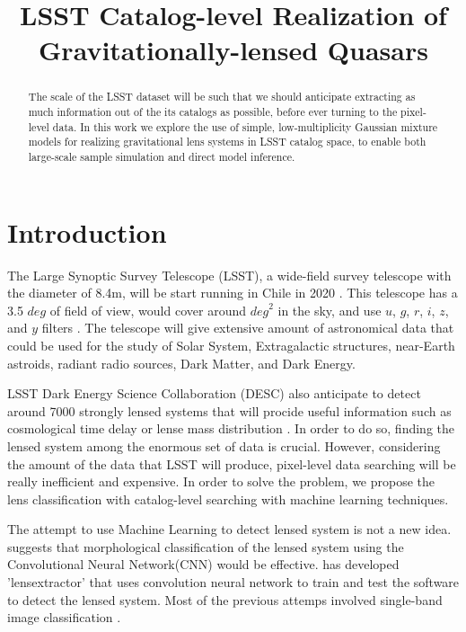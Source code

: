 \documentclass[\docopts]{\docclass}
\begin{document}
\title{ LSST Catalog-level Realization of Gravitationally-lensed Quasars }

\maketitlepre

\begin{abstract}

The scale of the LSST dataset will be such that we should anticipate
extracting as much information out of the its catalogs as possible,
before ever turning to the pixel-level data. In this work we explore the
use of simple, low-multiplicity Gaussian mixture models for realizing
gravitational lens systems in LSST catalog space, to enable both
large-scale sample simulation and direct model inference.

\end{abstract}

\maketitlepost


\section{Introduction}
\label{sec:intro}

The Large Synoptic Survey Telescope (LSST), a wide-field survey telescope with the diameter of 8.4m, will be start running in Chile in 2020 \cite{LSST_overall}. This telescope has a 3.5 $deg$ of field of view, would cover around $\textit{deg}^2$ in the sky, and use $u$, $g$, $r$, $i$, $z$, and $y$ filters \cite{LSST_Science_Book_v2.0}. The telescope will give extensive amount of astronomical data that could be used for the study of Solar System, Extragalactic structures, near-Earth astroids, radiant radio sources, Dark Matter, and Dark Energy. 

LSST Dark Energy Science Collaboration (DESC) also anticipate to detect around 7000 strongly lensed systems that will procide useful information such as cosmological time delay or lense mass distribution \cite{DESC_overall} \citep{time_delay_overall} \cite{Twinkles}. In order to do so, finding the lensed system among the enormous set of data is crucial. However, considering the amount of the data that LSST will produce, pixel-level data searching will be really inefficient and expensive. In order to solve the problem, we propose the lens classification with catalog-level searching with machine learning techniques.

The attempt to use Machine Learning to detect lensed system is not a new idea. \citep{convolution_neural_network} suggests that morphological classification of the lensed system using the Convolutional Neural Network(CNN) would be effective. \cite{lensextractor} has developed 'lensextractor' that uses convolution neural network to train and test the software to detect the lensed system. Most of the previous attemps involved single-band image classification \cite{lensextractor} \cite{convolution_neural_network}.
\end{document}
